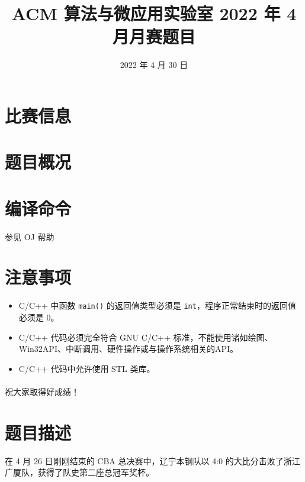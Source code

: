 \documentclass{ctpro}
\title{ACM 算法与微应用实验室 2022 年 4 月月赛题目}
\date{2022 年 4 月 30 日}
\begin{document}
\maketitle
{}

\section*{比赛信息}


\section*{题目概况}

\problemtab

\section*{编译命令}

参见 OJ 帮助

\section*{注意事项}

\begin{itemize}
    \item C/C++ 中函数 \verb|main()| 的返回值类型必须是 \verb|int|，程序正常结束时的返回值必须是 $0$。
    \item C/C++ 代码必须完全符合 GNU C/C++ 标准，不能使用诸如绘图、Win32API、中断调用、硬件操作或与操作系统相关的API。
    \item C/C++ 代码中允许使用 STL 类库。
\end{itemize}

\paragraph*{} 祝大家取得好成绩！

\makeproblem
\section*{题目描述}

在 4 月 26 日刚刚结束的 CBA 总决赛中，辽宁本钢队以 4:0 的大比分击败了浙江广厦队，获得了队史第二座总冠军奖杯。
\end{document}
